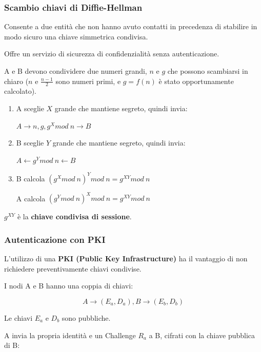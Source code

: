         \subsubsection{Scambio chiavi di Diffie-Hellman}
            Consente a due entità che non hanno avuto contatti in precedenza di stabilire in modo sicuro una chiave simmetrica condivisa.
        
            Offre un servizio di sicurezza di confidenzialità senza autenticazione.
        
            A e B devono condividere due numeri grandi, $n$ e $g$ che possono scambiarsi in chiaro ($n$ e $\frac{n-1}{2}$ sono numeri primi, e $g = f(n)$ è stato opportunamente calcolato).

            \begin{enumerate}
                \item A sceglie $X$ grande che mantiene segreto, quindi invia:
                
                $A \rightarrow n, g, g^X mod ~ n \rightarrow B$
                \item B sceglie $Y$ grande che mantiene segreto, quindi invia:
                
                $A \leftarrow g^Y mod ~ n \leftarrow B$
                \item B calcola $(g^X mod ~ n)^Y mod ~ n = g^{XY} mod ~ n$
                
                A calcola $(g^Y mod ~ n)^X mod ~ n = g^{XY} mod ~ n$
            \end{enumerate}

            $g^{XY}$ è la \textbf{chiave condivisa di sessione}.

        \subsubsection{Autenticazione con PKI}
            L'utilizzo di una \textbf{PKI (Public Key Infrastructure)} ha il vantaggio di non richiedere preventivamente chiavi condivise.

            I nodi A e B hanno una coppia di chiavi:

            \begin{equation*}
                A \rightarrow (E_a,D_a), B \rightarrow (E_b, D_b)
            \end{equation*}

            Le chiavi $E_a$ e $D_b$ sono pubbliche.

            A invia la propria identità e un Challenge $R_a$ a B, cifrati con la chiave pubblica di B:

